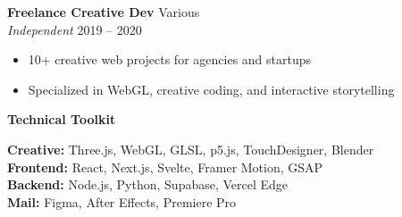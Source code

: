 \documentclass[10pt,letterpaper]{article}
\begin{document}
\begin{minipage}[t][0.96\textheight][t]{10.5cm}
\vspace{4pt}
\textbf{Freelance Creative Dev} \hfill Various\\
\textit{Independent} \hfill 2019 -- 2020
\begin{itemize}
\item 10+ creative web projects for agencies and startups
\item Specialized in WebGL, creative coding, and interactive storytelling
\end{itemize}

\vspace{10pt}
{\color{coral}\bfseries Technical Toolkit}

\vspace{4pt}
{\small
\textbf{Creative:} Three.js, WebGL, GLSL, p5.js, TouchDesigner, Blender\\
\textbf{Frontend:} React, Next.js, Svelte, Framer Motion, GSAP\\
\textbf{Backend:} Node.js, Python, Supabase, Vercel Edge\\
\textbf{Mail:} Figma, After Effects, Premiere Pro}

\end{minipage}
\end{document}
